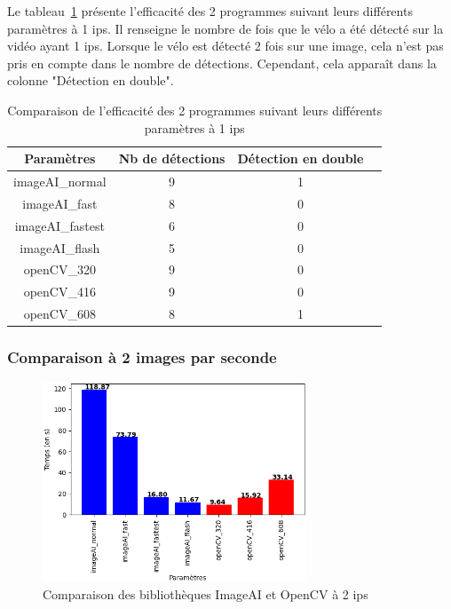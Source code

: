 Le tableau~\ref{tab_1fps} présente l'efficacité des 2 programmes suivant leurs différents paramètres à 1 ips.
Il renseigne le nombre de fois que le vélo a été détecté sur la vidéo ayant 1 ips.
Lorsque le vélo est détecté 2 fois sur une image, cela n'est pas pris en compte dans le nombre de détections.
Cependant, cela apparaît dans la colonne "Détection en double".

\begin{table}[H]
    \centering
    \begin{tabular}{|c|c|c|c|}
        \hline
        \rowcolor{tableColorDark} Paramètres & Nb de détections & Détection en double \\
        \hline

        imageAI\_normal                      & 9                & 1                   \\\hline
        imageAI\_fast                        & 8                & 0                   \\\hline
        imageAI\_fastest                     & 6                & 0                   \\\hline
        imageAI\_flash                       & 5                & 0                   \\\hline
        openCV\_320                          & 9                & 0                   \\\hline
        openCV\_416                          & 9                & 0                   \\\hline
        openCV\_608                          & 8                & 1                   \\\hline
    \end{tabular}
    \caption{Comparaison de l'efficacité des 2 programmes suivant leurs différents paramètres à 1 ips}
    \label{tab_1fps}
\end{table}

\subsubsection{Comparaison à 2 images par seconde}
\label{sec:comparaisonIA:resultats:2fps}

\begin{figure}[H]
    \centering
    \includegraphics[width=0.7\textwidth]{img/result_2fps.png}
    \caption{Comparaison des bibliothèques ImageAI et OpenCV à 2 ips}
\end{figure}

